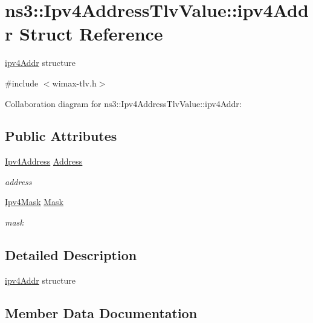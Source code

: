 \hypertarget{structns3_1_1Ipv4AddressTlvValue_1_1ipv4Addr}{}\section{ns3\+:\+:Ipv4\+Address\+Tlv\+Value\+:\+:ipv4\+Addr Struct Reference}
\label{structns3_1_1Ipv4AddressTlvValue_1_1ipv4Addr}


\hyperlink{structns3_1_1Ipv4AddressTlvValue_1_1ipv4Addr}{ipv4\+Addr} structure  




{\ttfamily \#include $<$wimax-\/tlv.\+h$>$}



Collaboration diagram for ns3\+:\+:Ipv4\+Address\+Tlv\+Value\+:\+:ipv4\+Addr\+:
\subsection*{Public Attributes}
\begin{DoxyCompactItemize}
\item 
\hyperlink{classns3_1_1Ipv4Address}{Ipv4\+Address} \hyperlink{structns3_1_1Ipv4AddressTlvValue_1_1ipv4Addr_a536cd63a0fc5101bd67ed6bc6d4d9b08}{Address}
\begin{DoxyCompactList}\small\item\em address \end{DoxyCompactList}\item 
\hyperlink{classns3_1_1Ipv4Mask}{Ipv4\+Mask} \hyperlink{structns3_1_1Ipv4AddressTlvValue_1_1ipv4Addr_a43cc1d9a8e8d40c69a8aab40a8d2f001}{Mask}
\begin{DoxyCompactList}\small\item\em mask \end{DoxyCompactList}\end{DoxyCompactItemize}


\subsection{Detailed Description}
\hyperlink{structns3_1_1Ipv4AddressTlvValue_1_1ipv4Addr}{ipv4\+Addr} structure 

\subsection{Member Data Documentation}
